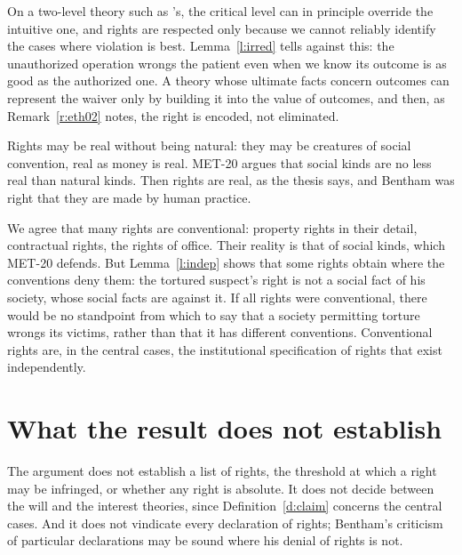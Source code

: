 \documentclass{situationist-preprint}
\begin{document}
\begin{reply}
On a two-level theory such as \citet{Hare1981}'s, the critical level can in principle override the intuitive one, and rights are respected only because we cannot reliably identify the cases where violation is best. Lemma~\ref{l:irred} tells against this: the unauthorized operation wrongs the patient even when we know its outcome is as good as the authorized one. A theory whose ultimate facts concern outcomes can represent the waiver only by building it into the value of outcomes, and then, as Remark~\ref{r:eth02} notes, the right is encoded, not eliminated.
\end{reply}

\begin{objection}
Rights may be real without being natural: they may be creatures of social convention, real as money is real. MET-20 argues that social kinds are no less real than natural kinds. Then rights are real, as the thesis says, and Bentham was right that they are made by human practice.
\end{objection}

\begin{reply}
We agree that many rights are conventional: property rights in their detail, contractual rights, the rights of office. Their reality is that of social kinds, which MET-20 defends. But Lemma~\ref{l:indep} shows that some rights obtain where the conventions deny them: the tortured suspect's right is not a social fact of his society, whose social facts are against it. If all rights were conventional, there would be no standpoint from which to say that a society permitting torture wrongs its victims, rather than that it has different conventions. Conventional rights are, in the central cases, the institutional specification of rights that exist independently.
\end{reply}

\section{What the result does not establish}

The argument does not establish a list of rights, the threshold at which a right may be infringed, or whether any right is absolute. It does not decide between the will and the interest theories, since Definition~\ref{d:claim} concerns the central cases. And it does not vindicate every declaration of rights; Bentham's criticism of particular declarations may be sound where his denial of rights is not.
\end{document}
